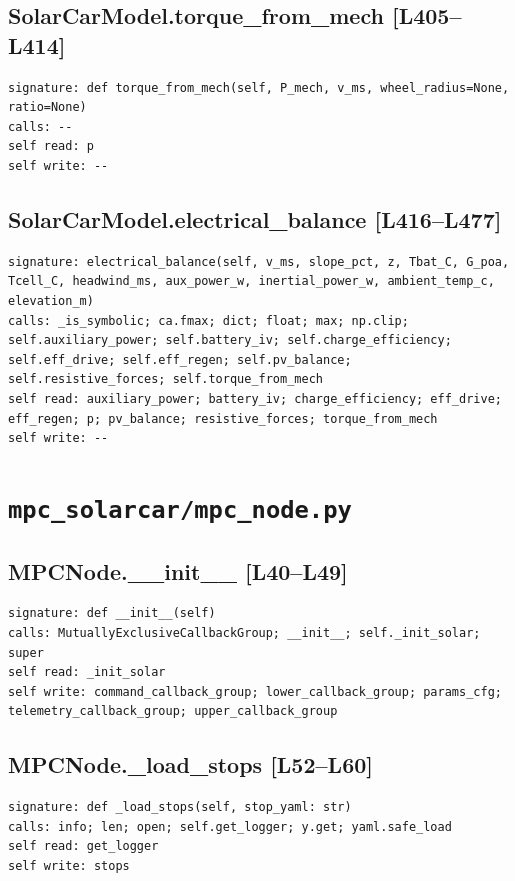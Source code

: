 \documentclass[a4paper,10pt,oneside]{book}
\begin{document}
\subsection*{SolarCarModel.torque\_from\_mech [L405--L414]}
\begin{lstlisting}[numbers=none]
signature: def torque_from_mech(self, P_mech, v_ms, wheel_radius=None, ratio=None)
calls: --
self read: p
self write: --
\end{lstlisting}
\subsection*{SolarCarModel.electrical\_balance [L416--L477]}
\begin{lstlisting}[numbers=none]
signature: electrical_balance(self, v_ms, slope_pct, z, Tbat_C, G_poa, Tcell_C, headwind_ms, aux_power_w, inertial_power_w, ambient_temp_c, elevation_m)
calls: _is_symbolic; ca.fmax; dict; float; max; np.clip; self.auxiliary_power; self.battery_iv; self.charge_efficiency; self.eff_drive; self.eff_regen; self.pv_balance; self.resistive_forces; self.torque_from_mech
self read: auxiliary_power; battery_iv; charge_efficiency; eff_drive; eff_regen; p; pv_balance; resistive_forces; torque_from_mech
self write: --
\end{lstlisting}
\section{\texttt{mpc\_solarcar/mpc\_node.py}}
\subsection*{MPCNode.\_\_init\_\_ [L40--L49]}
\begin{lstlisting}[numbers=none]
signature: def __init__(self)
calls: MutuallyExclusiveCallbackGroup; __init__; self._init_solar; super
self read: _init_solar
self write: command_callback_group; lower_callback_group; params_cfg; telemetry_callback_group; upper_callback_group
\end{lstlisting}
\subsection*{MPCNode.\_load\_stops [L52--L60]}
\begin{lstlisting}[numbers=none]
signature: def _load_stops(self, stop_yaml: str)
calls: info; len; open; self.get_logger; y.get; yaml.safe_load
self read: get_logger
self write: stops
\end{lstlisting}
\end{document}
